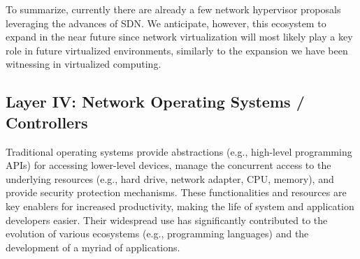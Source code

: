 To summarize, currently there are already a few network hypervisor proposals leveraging the advances of SDN.
We anticipate, however, this ecosystem to expand in the near future since network virtualization will most likely play a key role in future virtualized environments, similarly to the expansion we have been witnessing in virtualized computing.




\subsection{Layer IV: Network Operating Systems / Controllers}
\label{sec:controllers}

Traditional operating systems provide abstractions (e.g., high-level programming APIs) for accessing 
lower-level devices, manage the concurrent access to the underlying resources (e.g., hard drive, network 
adapter, CPU, memory), and provide security protection mechanisms. These functionalities and resources 
are key enablers for increased productivity, making the life of system and application developers easier. Their 
widespread use has significantly contributed to the evolution of various ecosystems (e.g., programming 
languages) and the development of a myriad of applications.


